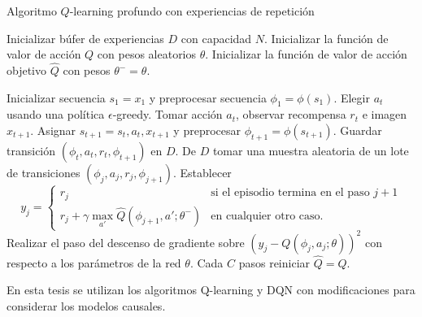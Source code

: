 \begin{mialgoritmo}[H]
  	\caption{Algoritmo $Q$-learning profundo con experiencias de repetición}
	\label{alg:dqn-algo}
  \begin{algorithmic}[1]
  \STATE Inicializar búfer de experiencias $D$ con capacidad $N$.
  \STATE Inicializar la función de valor de acción $Q$ con pesos aleatorios $\theta$.
  \STATE Inicializar la función de valor de acción objetivo $\hat{Q}$ con pesos $\theta^- = \theta$.
  
    \STATE Inicializar secuencia $s_1 = {x_1}$ y preprocesar secuencia $\phi_1 = \phi(s_1)$.
    \STATE Elegir $a_t$ usando una política $\epsilon$-greedy.
    \STATE Tomar acción $a_t$, observar recompensa $r_{t}$ e imagen $x_{t+1}$.
    \STATE Asignar $s_{t+1} =  s_t, a_t, x_{t+1}$ y preprocesar $\phi_{t+1} = \phi(s_{t+1})$.
    \STATE Guardar transición $(\phi_t, a_t, r_t, \phi_{t+1})$ en $D$.
    \STATE De $D$ tomar una muestra aleatoria de un lote de transiciones $(\phi_j, a_j, r_j, \phi_{j+1})$.
    \STATE Establecer
	\[
	 y_j = 
   \begin{cases} 
      r_j  & \mbox{si el episodio termina en el paso } j + 1 \\
      r_j + \gamma \max_{a'}\hat{Q}(\phi_{j+1}, a'; \theta^-) & \mbox{en cualquier otro caso.}
   \end{cases}
	\]
	\STATE Realizar el paso del
	descenso de gradiente sobre $(y_j -  Q(\phi_j,a_j;\theta))^2$ con respecto a los parámetros de la red $\theta$.
	\STATE Cada $C$ pasos reiniciar $\hat{Q} = Q$.
    \ENDFOR
  \ENDFOR
  \end{algorithmic}
\end{mialgoritmo}

En esta tesis se utilizan los algoritmos Q-learning y DQN con modificaciones para considerar los modelos causales.


	
	
